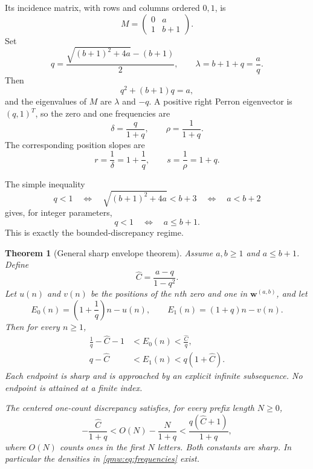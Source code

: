 \documentclass[11pt]{article}
\numberwithin{equation}{section}
\newtheorem{theorem}{Theorem}[section]
\theoremstyle{definition}
\theoremstyle{remark}
\newcommand{\word}{\mathbf{w}}
\begin{document}
Its incidence matrix, with rows and columns ordered $0,1$, is
\begin{equation}\label{qmw:eq:matrix}
M=\begin{pmatrix}0&a\\1&b+1\end{pmatrix}.
\end{equation}
Set
\begin{equation}\label{qmw:eq:q-lambda}
q=\frac{\sqrt{(b+1)^2+4a}-(b+1)}2,
\qquad
\lambda=b+1+q=\frac aq.
\end{equation}
Then
\begin{equation}\label{qmw:eq:qpoly}
q^2+(b+1)q=a,
\end{equation}
and the eigenvalues of $M$ are $\lambda$ and $-q$.  A positive right
Perron eigenvector is $(q,1)^T$, so the zero and one frequencies are
\begin{equation}\label{qmw:eq:frequencies}
\delta=\frac q{1+q},
\qquad
\rho=\frac1{1+q}.
\end{equation}
The corresponding position slopes are
\begin{equation}\label{qmw:eq:slopes}
r=\frac1\delta=1+\frac1q,
\qquad
s=\frac1\rho=1+q.
\end{equation}

The simple inequality
\[
q<1
\quad\Longleftrightarrow\quad
\sqrt{(b+1)^2+4a}<b+3
\quad\Longleftrightarrow\quad
a<b+2
\]
gives, for integer parameters,
\begin{equation}\label{qmw:eq:q-threshold}
q<1\quad\Longleftrightarrow\quad a\leq b+1.
\end{equation}
This is exactly the bounded-discrepancy regime.

\begin{theorem}[General sharp envelope theorem]\label{qmw:thm:general}
Assume $a,b\geq1$ and $a\leq b+1$.  Define
\begin{equation}\label{qmw:eq:Cdef}
{\widehat C}=\frac{a-q}{1-q^2}.
\end{equation}
Let $u(n)$ and $v(n)$ be the positions of the $n$th zero and one in
$\word^{(a,b)}$, and let
\[
E_0(n)=\left(1+\frac1q\right)n-u(n),
\qquad
E_1(n)=(1+q)n-v(n).
\]
Then for every $n\geq1$,
\begin{align}
\frac1q-{\widehat C}-1&<E_0(n)<\frac{\widehat C}q,
\label{qmw:eq:generalE0}\\
q-{\widehat C}&<E_1(n)<q(1+{\widehat C}).
\label{qmw:eq:generalE1}
\end{align}
Each endpoint is sharp and is approached by an explicit infinite
subsequence.  No endpoint is attained at a finite index.

The centered one-count discrepancy satisfies, for every prefix length
$N\geq0$,
\begin{equation}\label{qmw:eq:count-discrepancy}
-\frac{{\widehat C}}{1+q}
< O(N)-\frac{N}{1+q}
< \frac{q({\widehat C}+1)}{1+q},
\end{equation}
where $O(N)$ counts ones in the first $N$ letters.  Both constants are sharp.
In particular the densities in \eqref{qmw:eq:frequencies} exist.
\end{theorem}
\end{document}

